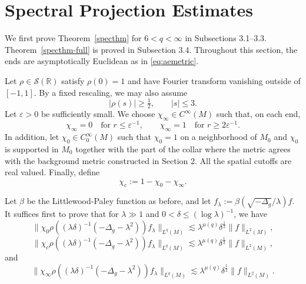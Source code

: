 \documentclass[11pt]{amsart}
\newcommand{\la}{\lambda}
\begin{document}
\section{Spectral Projection Estimates}

We first prove Theorem~\ref{specthm} for $6<q<\infty$ in Subsections 3.1--3.3. Theorem~\ref{specthm-full} is proved in Subsection 3.4. Throughout this section, the ends are asymptotically Euclidean as in \eqref{eq:aemetric}.

Let $\rho\in {\mathcal S}(\mathbb R)$ satisfy $\rho(0)=1$ and have Fourier transform vanishing outside of $[-1,1]$. By a fixed rescaling, we may also assume
\[
|\rho(s)|\geq\tfrac12,\qquad |s|\leq3.
\]
Let $\varepsilon>0$
be sufficiently small. We choose $\chi_\infty\in C^\infty(M)$ such
that, on each end,
\[
\chi_\infty=0\quad\text{for }r\leq\varepsilon^{-1},
\qquad
\chi_\infty=1\quad\text{for }r\geq2\varepsilon^{-1}.
\]
In addition, let $\chi_0\in C_0^\infty(M)$ such that $\chi_0=1$ on a neighborhood of $M_0$ and $\chi_0$ is supported in $M_0$ together with the part of the collar where the metric agrees with the background metric constructed in Section 2. All the spatial cutoffs are real valued.
Finally, define
\[
\chi_c:=1-\chi_0-\chi_\infty.
\]

Let $\beta$ be the Littlewood-Paley function as before, and let
$f_\la:=\beta(\sqrt{-\Delta_g}/\la)f.$
It suffices first to prove that for $\la\gg1$ and $0<\delta\leq(\log\la)^{-1}$, we have
\begin{equation}\label{3.3}
\| \chi_0 \rho((\la \delta)^{-1}(-\Delta_g-\la^2))f_\la\|_{L^q(M)}\lesssim 
    \la^{\mu(q)}\delta^{{\frac{1}{2}}}\|f\|_{L^2(M)},
\end{equation}
\begin{equation}\label{3.5}
\| \chi_c \rho((\la \delta)^{-1}(-\Delta_g-\la^2))f_\la\|_{L^q(M)}\lesssim 
    \la^{\mu(q)}\delta^{{\frac{1}{2}}}\|f\|_{L^2(M)},
\end{equation}
and
\begin{equation}\label{3.4}
\| \chi_\infty \rho((\la \delta)^{-1}(-\Delta_g-\la^2))f_\la\|_{L^q(M)}\lesssim\la^{\mu(q)}\delta^{\frac12} \|f\|_{L^2(M)}.
\end{equation}
\end{document}
